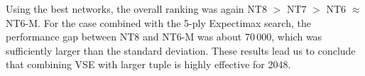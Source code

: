 Using the best networks, the overall ranking was again \textsf{NT8} $>$ \textsf{NT7} $>$ \textsf{NT6} $\approx$ \textsf{NT6-M}.
For the case combined with the 5-ply Expectimax search, the performance gap between \textsf{NT8} and \textsf{NT6-M} was about 70\,000, which was sufficiently larger than the standard deviation.
These results lead us to conclude that combining VSE with larger tuple is highly effective for 2048.

